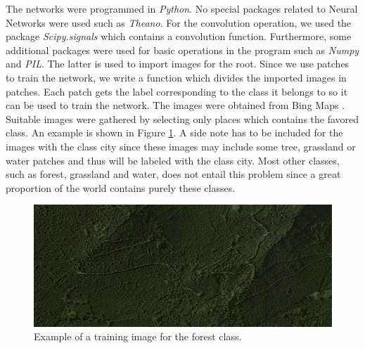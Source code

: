 \documentclass[a4paper,onecolumn]{report}
\begin{document}
The networks were programmed in \textit{Python}. No special packages related to Neural Networks were used such as \textit{Theano}. For the convolution operation, we used the package \textit{Scipy.signals} which contains a convolution function. Furthermore, some additional packages were used for basic operations in the program such as \textit{Numpy} and \textit{PIL}. The latter is used to import images for the root. Since we use patches to train the network, we write a function which divides the imported images in patches. Each patch gets the label corresponding to the class it belongs to so it can be used to train the network. The images were obtained from Bing Maps \cite{bing}. Suitable images were gathered by selecting only places which contains the favored class. An example is shown in Figure \ref{fig:classexample}. A side note has to be included for the images with the class city since these images may include some tree, grassland or water patches and thus will be labeled with the class city. Most other classes, such as forest, grassland and water, does not entail this problem since a great proportion of the world contains purely these classes.

\begin{figure}[h!]
    \centering
    \includegraphics[scale=0.4]{./images/classexample.png}
    \caption{Example of a training image for the forest class.}
	\label{fig:classexample}
\end{figure}
\end{document}
